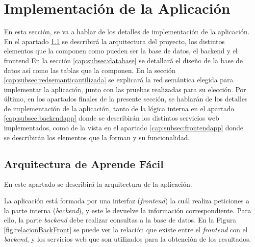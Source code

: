 \section{Implementación de la Aplicación}
\label{cap:sec:implementacionApp}

En esta sección, se va a hablar de los detalles de implementación de la aplicación. En el apartado \ref{cap:subsec:arquitectura} se describirá la arquitectura del proyecto, los distintos elementos que la componen como pueden ser la base de datos, el backend y el frontend En la sección \ref{cap:subsec:database} se detallará el diseño de la base de datos así como las tablas que la componen. En la sección \ref{cap:subsec:redsemanticautilizada} se explicará la red semántica elegida para implementar la aplicación, junto con las pruebas realizadas para su elección. Por último, en los apartados finales de la presente sección, se hablarán de los detalles de implementación de la aplicación, tanto de la lógica interna en el apartado \ref{cap:subsec:backendapp} donde se describirán los distintos servicios web implementados, como de la vista en el apartado \ref{cap:subsec:frontendapp} donde se describirán los elementos que la forman y su funcionalidad.


\subsection{Arquitectura de Aprende Fácil}
\label{cap:subsec:arquitectura}
En este apartado se describirá la arquitectura de la aplicación. 

La aplicación está formada por una interfaz (\textit{frontend}) la cuál realiza peticiones a la parte interna (\textit{backend}), y este le devuelve la información correspondiente. Para ello, la parte \textit{backend} debe realizar consultas a la base de datos. En la Figura \ref{fig:relacionBackFront}  se puede ver la relación que existe entre el \textit{frontend} con el \textit{backend}, y los servicios web que son utilizados para la obtención de los resultados.


